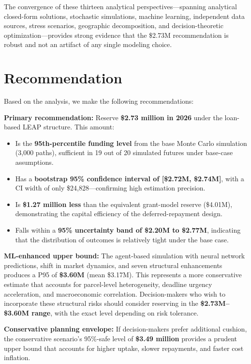 \documentclass[11pt, letterpaper]{article}
\begin{document}
The convergence of these thirteen analytical perspectives---spanning analytical closed-form solutions, stochastic simulations, machine learning, independent data sources, stress scenarios, geographic decomposition, and decision-theoretic optimization---provides strong evidence that the \$2.73M recommendation is robust and not an artifact of any single modeling choice.

\section{Recommendation}
\label{sec:recommendation}

Based on the analysis, we make the following recommendations:

\textbf{Primary recommendation:} Reserve \textbf{\$2.73 million in 2026} under the loan-based LEAP structure. This amount:

\begin{itemize}[nosep]
  \item Is the \textbf{95th-percentile funding level} from the base Monte Carlo simulation (3{,}000 paths), sufficient in 19 out of 20 simulated futures under base-case assumptions.
  \item Has a \textbf{bootstrap 95\% confidence interval of [\$2.72M, \$2.74M]}, with a CI width of only \$24{,}828---confirming high estimation precision.
  \item Is \textbf{\$1.27 million less} than the equivalent grant-model reserve (\$4.01M), demonstrating the capital efficiency of the deferred-repayment design.
  \item Falls within a \textbf{95\% uncertainty band of \$2.20M to \$2.77M}, indicating that the distribution of outcomes is relatively tight under the base case.
\end{itemize}

\textbf{ML-enhanced upper bound:} The agent-based simulation with neural network predictions, shift in market dynamics, and seven structural enhancements produces a P95 of \textbf{\$3.60M} (mean \$3.17M). This represents a more conservative estimate that accounts for parcel-level heterogeneity, deadline urgency acceleration, and macroeconomic correlation. Decision-makers who wish to incorporate these structural risks should consider reserving in the \textbf{\$2.73M--\$3.60M range}, with the exact level depending on risk tolerance.

\textbf{Conservative planning envelope:} If decision-makers prefer additional cushion, the conservative scenario's 95\%-safe level of \textbf{\$3.49 million} provides a prudent upper bound that accounts for higher uptake, slower repayments, and faster cost inflation.
\end{document}
